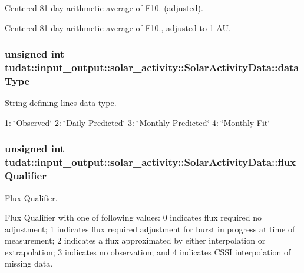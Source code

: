 Centered 81-\/day arithmetic average of F10. (adjusted). 

Centered 81-\/day arithmetic average of F10., adjusted to 1 AU. 
\subsubsection[{\texorpdfstring{data\+Type}{dataType}}]{\setlength{\rightskip}{0pt plus 5cm}unsigned int tudat\+::input\+\_\+output\+::solar\+\_\+activity\+::\+Solar\+Activity\+Data\+::data\+Type}\hypertarget{structtudat_1_1input__output_1_1solar__activity_1_1SolarActivityData_a594d19abac77a3fc12581ed2dc3e1610}{}\label{structtudat_1_1input__output_1_1solar__activity_1_1SolarActivityData_a594d19abac77a3fc12581ed2dc3e1610}


String defining line\textquotesingle{}s data-\/type. 

1\+: \char`\"{}\+Observed\char`\"{} 2\+: \char`\"{}\+Daily Predicted\char`\"{} 3\+: \char`\"{}\+Monthly Predicted\char`\"{} 4\+: \char`\"{}\+Monthly Fit\char`\"{} 
\subsubsection[{\texorpdfstring{flux\+Qualifier}{fluxQualifier}}]{\setlength{\rightskip}{0pt plus 5cm}unsigned int tudat\+::input\+\_\+output\+::solar\+\_\+activity\+::\+Solar\+Activity\+Data\+::flux\+Qualifier}\hypertarget{structtudat_1_1input__output_1_1solar__activity_1_1SolarActivityData_a4ccc6def146e5a92be41d2ff879c22e0}{}\label{structtudat_1_1input__output_1_1solar__activity_1_1SolarActivityData_a4ccc6def146e5a92be41d2ff879c22e0}


Flux Qualifier. 

Flux Qualifier with one of following values\+: 0 indicates flux required no adjustment; 1 indicates flux required adjustment for burst in progress at time of measurement; 2 indicates a flux approximated by either interpolation or extrapolation; 3 indicates no observation; and 4 indicates C\+S\+SI interpolation of missing data. 

